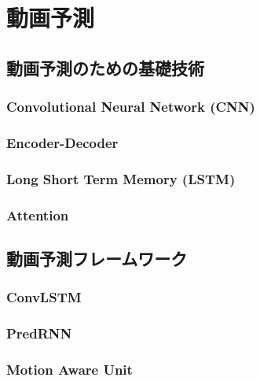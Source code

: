 \chapter{動画予測}

  \section{動画予測のための基礎技術}

    \subsection{Convolutional Neural Network (CNN)}
    \subsection{Encoder-Decoder}
    \subsection{Long Short Term Memory (LSTM)}
    \subsection{Attention}


  \section{動画予測フレームワーク}
    \subsection{ConvLSTM}
    \subsection{PredRNN}
    \subsection{Motion Aware Unit}
